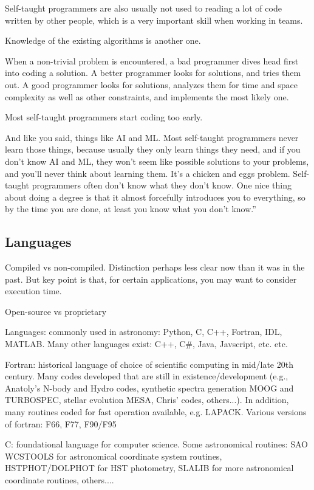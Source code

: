 \documentclass{article}
\begin{document}
Self-taught programmers are also usually not used to reading a lot of
code written by other people, which is a very important skill when
working in teams.

Knowledge of the existing algorithms is another one.

When a non-trivial problem is encountered, a bad programmer dives head
first into coding a solution. A better programmer looks for solutions,
and tries them out. A good programmer looks for solutions, analyzes
them for time and space complexity as well as other constraints, and
implements the most likely one.

Most self-taught programmers start coding too early.

And like you said, things like AI and ML\@. Most self-taught programmers
never learn those things, because usually they only learn things they
need, and if you don't know AI and ML, they won't seem like possible
solutions to your problems, and you'll never think about learning
them. It's a chicken and eggs problem. Self-taught programmers often
don't know what they don't know. One nice thing about doing a degree
is that it almost forcefully introduces you to everything, so by the
time you are done, at least you know what you don't know.''

\subsection{Languages}
Compiled vs non-compiled. Distinction perhaps less clear now than it
was in the past. But key point is that, for certain applications, you
may want to consider execution time.

Open-source vs proprietary

Languages: commonly used in astronomy: Python, C, C++, Fortran, IDL,
MATLAB. Many other languages exist: C++, C\#, Java, Javscript, etc.
etc.

Fortran: historical language of choice of scientific computing in
mid/late 20th century. Many codes developed that are still in
existence/development (e.g., Anatoly's N-body and Hydro codes,
synthetic spectra generation MOOG and TURBOSPEC, stellar evolution
MESA, Chris' codes, others...). In addition, many routines coded for
fast operation available, e.g. LAPACK. Various versions of fortran:
F66, F77, F90/F95

C: foundational language for computer science. Some astronomical
routines: SAO WCSTOOLS for astronomical coordinate system routines,
HSTPHOT/DOLPHOT for HST photometry, SLALIB for more astronomical
coordinate routines, others....
\end{document}
